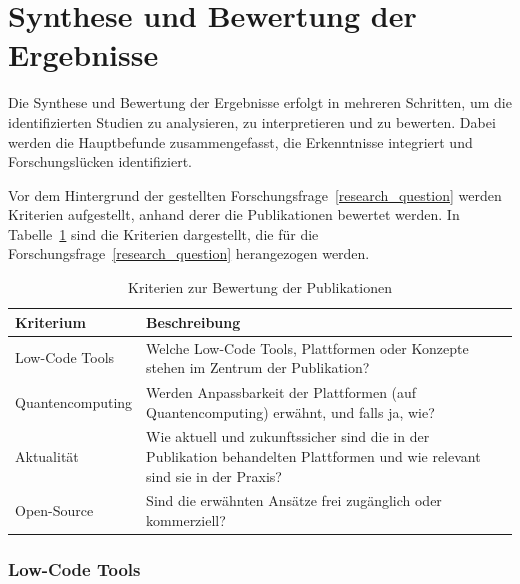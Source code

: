 
\section{Synthese und Bewertung der Ergebnisse}
Die Synthese und Bewertung der Ergebnisse erfolgt in mehreren Schritten, um die identifizierten Studien zu analysieren, 
zu interpretieren und zu bewerten. Dabei werden die Hauptbefunde zusammengefasst, die Erkenntnisse integriert und 
Forschungslücken identifiziert. 

Vor dem Hintergrund der gestellten Forschungsfrage~\ref{research_question} werden Kriterien aufgestellt, anhand derer die Publikationen 
bewertet werden. In Tabelle~\ref{tab:evaluation_criteria} sind die Kriterien dargestellt, die für die Forschungsfrage~\ref{research_question} 
herangezogen werden. 

\begin{table}[h!]
    \centering
    \caption{Kriterien zur Bewertung der Publikationen}
    \label{tab:evaluation_criteria}
    \begin{tabular}{|p{5cm}|p{9cm}|}
    \hline
    \textbf{Kriterium} & \textbf{Beschreibung} \\ \hline
    Low-Code Tools & Welche Low-Code Tools, Plattformen oder Konzepte stehen im Zentrum der Publikation? \\ \hline
    Quantencomputing & Werden Anpassbarkeit der Plattformen (auf Quantencomputing) erwähnt, und falls ja, wie? \\ \hline
    Aktualität & Wie aktuell und zukunftssicher sind die in der Publikation behandelten Plattformen und wie relevant sind sie in der Praxis? \\ \hline
    Open-Source & Sind die erwähnten Ansätze frei zugänglich oder kommerziell? \\ \hline
    \end{tabular}
\end{table}

\subsubsection{Low-Code Tools}


